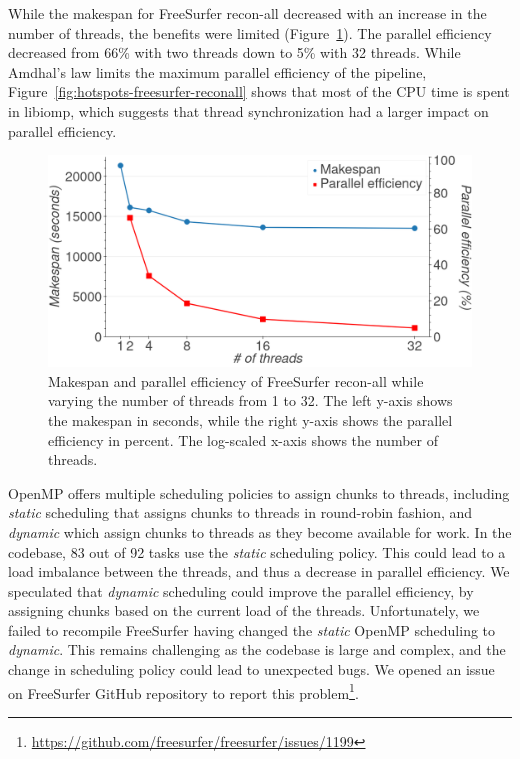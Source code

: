 \documentclass[conference]{IEEEtran}
\begin{document}
While the makespan for FreeSurfer recon-all decreased with an increase in the number of threads, the benefits were limited (Figure~\ref{fig:freesurfer-threading}). The parallel efficiency decreased from 66\% with two threads down to 5\% with 32 threads. While Amdhal's law limits the maximum parallel efficiency of the pipeline, Figure~\ref{fig:hotspots-freesurfer-reconall} shows that most of the CPU time is spent in libiomp, which suggests that thread synchronization had a larger impact on parallel efficiency.	
\begin{figure}
	\includegraphics[width=\linewidth]{figures/makespan-freesurfer.png}
	\caption{Makespan and parallel efficiency of FreeSurfer recon-all while varying the number of threads from 1 to 32. The left y-axis shows the makespan in seconds, while the right y-axis shows the parallel efficiency in percent. The log-scaled x-axis shows the number of threads.}
	\label{fig:freesurfer-threading}
\end{figure}

OpenMP offers multiple scheduling policies to assign chunks to threads, including \textit{static} scheduling that assigns chunks to threads in round-robin fashion, and \textit{dynamic} which assign chunks to threads as they become available for work. In the codebase, 83 out of 92 tasks use the \textit{static} scheduling policy. This could lead to a load imbalance between the threads, and thus a decrease in parallel efficiency. We speculated that \textit{dynamic} scheduling could improve the parallel efficiency, by assigning chunks based on the current load of the threads. Unfortunately, we failed to recompile FreeSurfer having changed the \textit{static} OpenMP scheduling to \textit{dynamic}. This remains challenging as the codebase is large and complex, and the change in scheduling policy could lead to unexpected bugs.
We opened an issue on FreeSurfer GitHub repository to report this problem\footnote{\href{https://github.com/freesurfer/freesurfer/issues/1199}{https://github.com/freesurfer/freesurfer/issues/1199}}.
			
\end{document}
